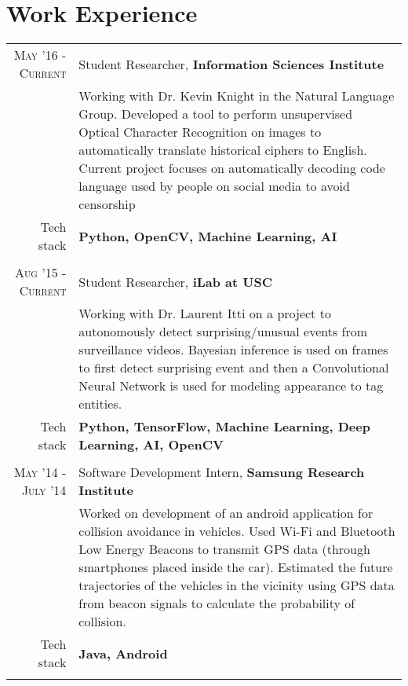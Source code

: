 \section{Work Experience}
\renewcommand{\arraystretch}{0.85}%
\begin{tabular}{r|p{13cm}}
\textsc{May '16 - Current} & Student Researcher, \textbf{Information Sciences Institute} \\
& \small{Working with Dr. Kevin Knight in the Natural Language Group. Developed a tool to perform unsupervised Optical Character Recognition on images to automatically translate historical ciphers to English. Current project focuses on automatically decoding code language used by people on social media to avoid censorship}\\
\small{Tech stack} &\footnotesize{\textbf{Python, OpenCV, Machine Learning, AI}} \\
\multicolumn{2}{c}{} \\

\textsc{Aug '15 - Current} & Student Researcher, \textbf{iLab at USC} \\
& \small{Working with Dr. Laurent Itti on a project to autonomously detect surprising/unusual events from surveillance videos. Bayesian inference is used on frames to first detect surprising event and then a Convolutional Neural Network is used for modeling appearance to tag entities.}\\
\small{Tech stack} &\footnotesize{\textbf{Python, TensorFlow, Machine Learning, Deep Learning, AI, OpenCV}} \\
\multicolumn{2}{c}{} \\

\textsc{May '14 - July '14 } & Software Development Intern, \textbf{Samsung Research Institute} \\
& \small{Worked on development of an android application for collision avoidance in vehicles. Used Wi-Fi and Bluetooth Low Energy Beacons to transmit GPS data (through smartphones placed inside the car). Estimated the future trajectories of the vehicles in the vicinity using GPS data from beacon signals to calculate the probability of collision.}\\
\small{Tech stack} &\footnotesize{\textbf{Java, Android}} \\
\multicolumn{2}{c}{}


\end{tabular}
